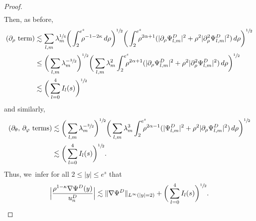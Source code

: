 \documentclass[JEP,XML,SOM,Unicode]{cedram}
\theoremstyle{plain}
\theoremstyle{definition}
\begin{document}
\begin{proof}
\[\begin{aligned}
\end{aligned}
\]
Then, as before,
\[
\begin{aligned}
(\partial_\rho \text{ term}) &\lesssim\sum_{l,m}\lambda_m^{\sfrac{1}{4}}\bigg(\int_2^{e^s}\hspace*{-2.5mm} \rho^{-1-2\kappa}\,d\rho\bigg)^{\sfrac{1}{2}}\bigg(\int_2^{e^s}\hspace*{-2.5mm}\rho^{2\alpha+1}(|\partial_\rho\Psi_{l,m}^D|^2+\rho^2|\partial_\rho^2\Psi_{l,m}^D|^2)\,d\rho\bigg)^{\sfrac{1}{2}}\\
&\le \bigg(\sum_{l,m} \lambda_m^{-\sfrac{3}{2}}\bigg)^{\sfrac{1}{2}}\bigg(\sum_{l,m}\lambda_m^2\int_2^{e^s}\hspace*{-2.5mm}\rho^{2\alpha+1}(|\partial_\rho\Psi_{l,m}^D|^2+\rho^2|\partial_\rho^2\Psi_{l,m}^D|^2)\,d\rho\bigg)^{\sfrac{1}{2}}\\
&\lesssim \bigg(\sum_{l=0}^4I_l(s)\bigg)^{\sfrac{1}{2}}
\end{aligned}
\]
and similarly,\vspace*{-3pt}
\[
\begin{aligned}
(\partial_\theta,\,\partial_\varphi\text{ terms})
&\lesssim\bigg(\sum_{l,m} \lambda_m^{-\sfrac{3}{2}}\bigg)^{\sfrac{1}{2}}\bigg(\sum_{l,m}\lambda_m^3\int_2^{e^s}\hspace*{-2.5mm}\rho^{2\alpha-1}(|\Psi_{l,m}^D|^2+\rho^2|\partial_\rho\Psi_{l,m}^D|^2)\,d\rho\bigg)^{\sfrac{1}{2}}\\
&\lesssim\bigg(\sum_{l=0}^4I_l(s)\bigg)^{\sfrac{1}{2}}.
\end{aligned}
\]
Thus, we~infer for all $2\le |y|\le e^s$ that\vspace*{-3pt}
\[
\Big|\frac{\rho^{1-\kappa}\nabla\Psi^D(y)}{u_n^D}\Big|\lesssim
\Vert \nabla\Psi^D\Vert_{L^\infty(|y|=2)}+\bigg(\sum_{l=0}^4I_l(s)\bigg)^{\sfrac{1}{2}}.
\]


\end{proof}
\end{document}
